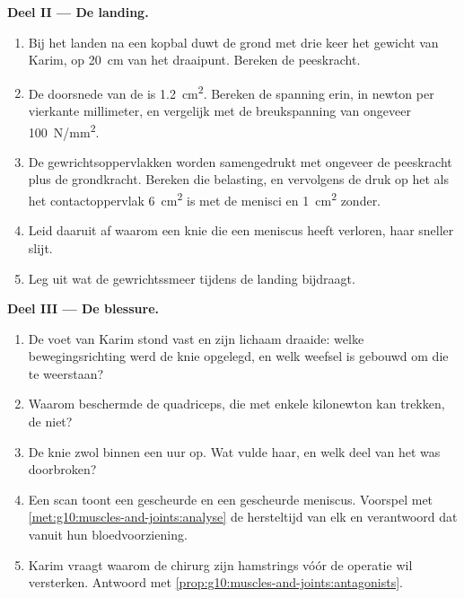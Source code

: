 \begin{problem}
\medskip
\noindent\textbf{Deel II --- De landing.}
\begin{enumerate}[resume]
  \item Bij het landen na een kopbal duwt de grond met drie keer het
        gewicht van Karim, op \qty{20}{cm} van het draaipunt. Bereken de
        peeskracht.
  \item De doorsnede van de  is \qty{1.2}{cm^2}. Bereken de spanning
        erin, in newton per vierkante millimeter, en vergelijk met de
        breukspanning van ongeveer \qty{100}{N/mm^2}.
  \item De gewrichtsoppervlakken worden samengedrukt met ongeveer de
        peeskracht plus de grondkracht. Bereken die belasting, en
        vervolgens de druk op het  als het contactoppervlak
        \qty{6}{cm^2} is met de menisci en \qty{1}{cm^2} zonder.
  \item Leid daaruit af waarom een knie die een meniscus heeft verloren,
        haar  sneller slijt.
  \item Leg uit wat de gewrichtssmeer tijdens de landing bijdraagt.
\end{enumerate}

\medskip
\noindent\textbf{Deel III --- De blessure.}
\begin{enumerate}[resume]
  \item De voet van Karim stond vast en zijn lichaam draaide: welke
        bewegingsrichting werd de knie opgelegd, en welk weefsel is
        gebouwd om die te weerstaan?
  \item Waarom beschermde de quadriceps, die met enkele kilonewton kan
        trekken, de  niet?
  \item De knie zwol binnen een uur op. Wat vulde haar, en welk deel van
        het  was doorbroken?
  \item Een scan toont een gescheurde  en een gescheurde
        meniscus. Voorspel met
        \cref{met:g10:muscles-and-joints:analyse} de hersteltijd van elk
        en verantwoord dat vanuit hun bloedvoorziening.
  \item Karim vraagt waarom de chirurg zijn hamstrings vóór de operatie
        wil versterken. Antwoord met
        \cref{prop:g10:muscles-and-joints:antagonists}.
\end{enumerate}


\end{problem}
